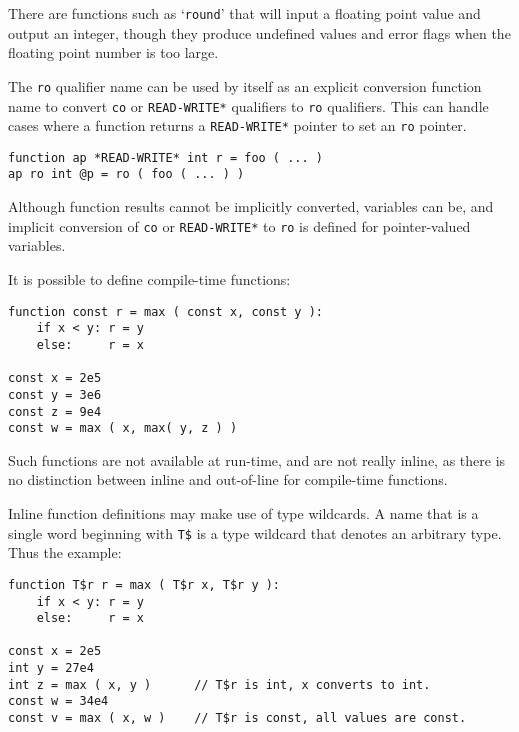 \documentclass[12pt]{article}
\newenvironment{indpar}[1][0.3in]%
	{\begin{list}{}%
		     {\setlength{\itemsep}{0in}%
		      \setlength{\topsep}{0in}%
		      \setlength{\parsep}{1ex}%
		      \setlength{\labelwidth}{#1}%
		      \setlength{\leftmargin}{#1}%
		      \addtolength{\leftmargin}{\labelsep}}%
	 \item}%
	{\end{list}}
\begin{document}
There are functions such as `{\tt round}' that will input a floating
point value and output an integer, though they produce undefined
values and error flags when the floating point number is too large.

The {\tt ro} qualifier name can be used by itself as an explicit
conversion function name to convert
{\tt co} or {\tt *READ-WRITE*} qualifiers to {\tt ro} qualifiers.
This can handle cases where a function returns a {\tt *READ-WRITE*}
pointer to set an {\tt ro} pointer.

\begin{indpar}\begin{verbatim}
function ap *READ-WRITE* int r = foo ( ... )
ap ro int @p = ro ( foo ( ... ) )
\end{verbatim}\end{indpar}

Although function results cannot be implicitly converted, variables
can be, and implicit conversion of {\tt co} or {\tt *READ-WRITE*} to
{\tt ro} is defined for pointer-valued variables.

It is possible to define compile-time functions:

\begin{indpar}\begin{verbatim}
function const r = max ( const x, const y ):
    if x < y: r = y
    else:     r = x

const x = 2e5
const y = 3e6
const z = 9e4
const w = max ( x, max( y, z ) )
\end{verbatim}\end{indpar}

Such functions are not available at run-time, and
are not really inline, as there is no
distinction between inline and out-of-line for compile-time functions.

Inline function definitions may make use of type wildcards.
A name that is a single word beginning with {\tt T\$}
is a type wildcard that denotes
an arbitrary type.  Thus the example:

\begin{indpar}\begin{verbatim}
function T$r r = max ( T$r x, T$r y ):
    if x < y: r = y
    else:     r = x

const x = 2e5
int y = 27e4
int z = max ( x, y )      // T$r is int, x converts to int.
const w = 34e4
const v = max ( x, w )    // T$r is const, all values are const.
\end{verbatim}\end{indpar}
\end{document}
